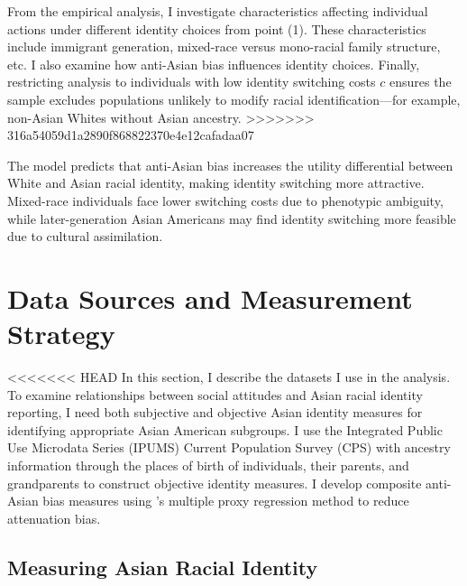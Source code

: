 From the empirical analysis, I investigate characteristics affecting individual actions under different identity choices from point (1). These characteristics include immigrant generation, mixed-race versus mono-racial family structure, etc. I also examine how anti-Asian bias influences identity choices. Finally, restricting analysis to individuals with low identity switching costs $c$ ensures the sample excludes populations unlikely to modify racial identification—for example, non-Asian Whites without Asian ancestry.
>>>>>>> 316a54059d1a2890f868822370e4e12cafadaa07

The model predicts that anti-Asian bias increases the utility differential between White and Asian racial identity, making identity switching more attractive. Mixed-race individuals face lower switching costs due to phenotypic ambiguity, while later-generation Asian Americans may find identity switching more feasible due to cultural assimilation.

\section{Data Sources and Measurement Strategy}\label{sec:data}

<<<<<<< HEAD
In this section, I describe the datasets I use in the analysis. To examine relationships between social attitudes and Asian racial identity reporting, I need both subjective and objective Asian identity measures for identifying appropriate Asian American subgroups. I use the Integrated Public Use Microdata Series (IPUMS) Current Population Survey (CPS) \autocite{floodsarahIntegratedPublicUse2021a} with ancestry information through the places of birth of individuals, their parents, and grandparents to construct objective identity measures. I develop composite anti-Asian bias measures using \textcite{lubotskyInterpretationRegressionsMultiple2006}'s multiple proxy regression method to reduce attenuation bias.

\subsection{Measuring Asian Racial Identity}\label{subsec:cps}

